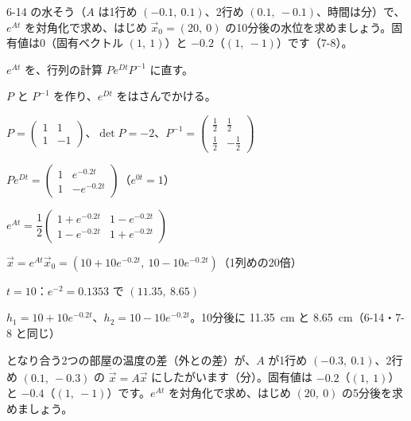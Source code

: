 \begin{reidai}[水そうを対角化で]
6-14 の水そう（$A$ は1行め $(-0.1,\ 0.1)$、2行め $(0.1,\ -0.1)$、時間は分）で、$e^{At}$ を対角化で求め、はじめ $\vec x_0=(20,\ 0)$ の10分後の水位を求めましょう。固有値は0（固有ベクトル $(1,\ 1)$）と $-0.2$（$(1,\ -1)$）です（7-8）。\par
\kangaekata {}\par
{}\enspace $e^{At}$ を、行列の計算 $Pe^{Dt}P^{-1}$ に直す。\par
{}\enspace $P$ と $P^{-1}$ を作り、$e^{Dt}$ をはさんでかける。\par
\shiki\kixls{}\zw{} $P=\begin{pmatrix}1&1\\1&-1\end{pmatrix}$、$\det P=-2$、$P^{-1}=\begin{pmatrix}\frac12&\frac12\\[2pt]\frac12&-\frac12\end{pmatrix}$\par
\kixla $Pe^{Dt}=\begin{pmatrix}1&e^{-0.2t}\\1&-e^{-0.2t}\end{pmatrix}$\quad （$e^{0t}=1$）\par
\kixla $e^{At}=\dfrac12\begin{pmatrix}1+e^{-0.2t}&1-e^{-0.2t}\\1-e^{-0.2t}&1+e^{-0.2t}\end{pmatrix}$\par
\kixla $\vec x=e^{At}\vec x_0=(10+10e^{-0.2t},\ 10-10e^{-0.2t})$\quad （1列めの20倍）\par
\kixla $t=10$：$e^{-2}=0.1353$ で $(11.35,\ 8.65)$\par
\kotae $h_1=10+10e^{-0.2t}$、$h_2=10-10e^{-0.2t}$。10分後に \qty{11.35}{cm} と \qty{8.65}{cm}（6-14・7-8 と同じ）
\end{reidai}

\begin{jibun}
となり合う2つの部屋の温度の差（外との差）が、$A$ が1行め $(-0.3,\ 0.1)$、2行め $(0.1,\ -0.3)$ の $\dot{\vec x}=A\vec x$ にしたがいます（分）。固有値は $-0.2$（$(1,\ 1)$）と $-0.4$（$(1,\ -1)$）です。$e^{At}$ を対角化で求め、はじめ $(20,\ 0)$ の5分後を求めましょう。
\end{jibun}


